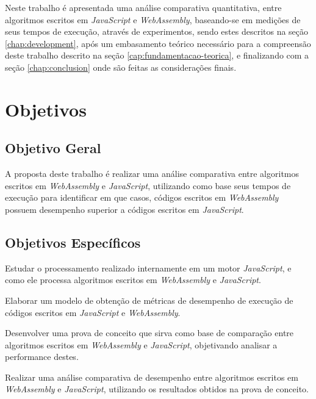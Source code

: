 Neste trabalho é apresentada uma análise comparativa quantitativa, entre algoritmos
escritos em \textit{JavaScript} e \textit{WebAssembly}, baseando-se em medições de seus
tempos de execução, através de experimentos, sendo estes descritos na seção
\ref{chap:development}, após um embasamento teórico necessário para a compreensão deste
trabalho descrito na seção \ref{cap:fundamentacao-teorica}, e finalizando com a seção
\ref{chap:conclusion} onde são feitas as considerações finais.

\section{Objetivos}
\label{sec:goals}

\subsection{Objetivo Geral}
\label{sec:general-goal}

A proposta deste trabalho é realizar uma análise comparativa entre algoritmos escritos em
\textit{WebAssembly} e \textit{JavaScript}, utilizando como base seus tempos de execução
para identificar em que casos, códigos escritos em \textit{WebAssembly} possuem desempenho
superior a códigos escritos em \textit{JavaScript}.

\subsection{Objetivos Específicos}
\label{sec:spec-goals}

\begin{alineas}
    \item Estudar o processamento realizado internamente em um motor \textit{JavaScript},
    e como ele processa algoritmos escritos em \textit{WebAssembly} e \textit{JavaScript}.
    \item Elaborar um modelo de obtenção de métricas de desempenho de execução de códigos
    escritos em \textit{JavaScript} e \textit{WebAssembly}.
    \item Desenvolver uma prova de conceito que sirva como base de comparação entre
    algoritmos escritos em \textit{WebAssembly} e \textit{JavaScript}, objetivando
    analisar a performance destes.
    \item Realizar uma análise comparativa de desempenho entre algoritmos escritos
    em \textit{WebAssembly} e \textit{JavaScript}, utilizando os resultados obtidos na
    prova de conceito.
\end{alineas}